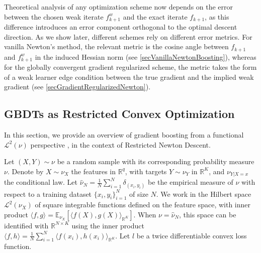 \documentclass{article}
\theoremstyle{plain}
\theoremstyle{definition}
\theoremstyle{remark}
\newcommand{\bbR}{\mathbb{R}}
\newcommand{\E}{\mathbb{E}}
\begin{document}
Theoretical analysis of any optimization scheme now depends on the error between the chosen weak iterate $f^w_{k+1}$ and the exact iterate $f_{k+1}$, as this difference introduces an error component orthogonal to the optimal descent direction. As we show later, different schemes rely on different error metrics. For vanilla Newton's method, the relevant metric is the cosine angle between $f_{k+1}$ and $f^w_{k+1}$ in the induced Hessian norm (see \cref{secVanillaNewtonBoosting}), whereas for the globally convergent gradient regularized scheme, the metric takes the form of a weak learner edge condition between the true gradient and the implied weak gradient (see \cref{secGradientRegularizedNewton}).

\subsection{GBDTs as Restricted Convex Optimization}\label{subsec:GBDTsAsRestrictedConvexOptimization}

In this section, we provide an overview of gradient boosting from a functional $\mathcal{L}^2(\nu)$ perspective \cite{2011GeneralizedBoostingAlgorithmsForConvexOptimization, 2020GeneralizedBoosting}, in the context of Restricted Newton Descent.

Let $(X, Y) \sim \nu$ be a random sample with its corresponding probability measure $\nu$. Denote by $X \sim \nu_X$ the features in $\bbR^q$, with targets $Y \sim \nu_Y$ in $\bbR^K$, and $\nu_{Y|X=x}$ the conditional law. Let $\widehat{\nu}_N = \frac{1}{N}\sum_{i=1}^N \delta_{(x_i, y_i)}$ be the empirical measure of $\nu$ with respect to a training dataset $\{x_i, y_i\}_{i=1}^N$ of size $N$. We work in the Hilbert space $\mathcal{L}^2(\nu_X)$ of square integrable functions defined on the feature space, with inner product $\langle f, g\rangle = \E_{\nu_X}[\langle f(X),g(X) \rangle_{\bbR^K}]$. When $\nu = \widehat{\nu}_N$, this space can be identified with $\mathbb{R}^{N\times K}$ using the inner product $\langle f, h\rangle = \frac{1}{N}\sum_{i=1}^N \langle f(x_i),h(x_i) \rangle_{\bbR^K}$. Let $l$ be a twice differentiable convex loss function.
\end{document}
